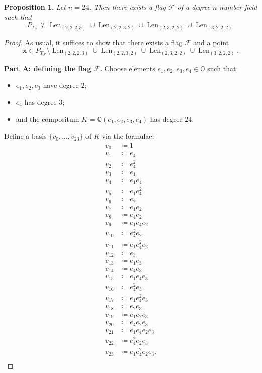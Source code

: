 \documentclass[letterpaper,10pt]{amsart}
\DeclareMathOperator{\Len}{Len}
\newcommand{\QQ}{\mathbb{Q}}      %
\newcommand{\cF}{\mathcal{F}}
\newtheorem{proposition}[theorem]{Proposition}
\theoremstyle{definition}
\theoremstyle{remark}
\begin{document}
\begin{proposition}
\label{lem:24}
Let $n = 24$. Then there exists a flag $\cF$ of a degree $n$ number field such that 
\[
	P_{T_{\cF}} \not \subseteq \Len_{(2,2,2,3)} \cup \Len_{(2,2,3,2)} \cup \Len_{(2,3,2,2)} \cup \Len_{(3,2,2,2)}
\]
\end{proposition}
\begin{proof}
As usual, it suffices to show that there exists a flag $\cF$ and a point
\[
	\mathbf{x} \in P_{T_{\cF}} \setminus  \Len_{(2,2,2,3)} \cup \Len_{(2,2,3,2)} \cup \Len_{(2,3,2,2)} \cup \Len_{(3,2,2,2)}.
\]

\noindent \textbf{Part A: defining the flag $\cF$.}
Choose elements $e_1,e_2,e_3,e_4 \in \overline{\QQ}$ such that:
\begin{itemize}
\item $e_1,e_2,e_3$ have degree $2$;
\item $e_4$ has degree $3$;
\item and the compositum $K= \QQ(e_1,e_2,e_3,e_4)$ has degree $24$.
\end{itemize}
Define a basis $\{v_0,\dots,v_{23}\}$ of $K$ via the formulae:
\begin{align*}
v_0 & \coloneqq 1 \\
v_1 & \coloneqq e_4 \\
v_2 & \coloneqq e^2_4 \\
v_3 & \coloneqq e_1 \\
v_4 & \coloneqq e_1e_4 \\
v_5 & \coloneqq e_1e_4^2 \\
v_6 & \coloneqq e_2 \\
v_7 & \coloneqq e_1e_2 \\
v_8 & \coloneqq e_4e_2 \\
v_9 & \coloneqq e_1e_4e_2 \\
v_{10} & \coloneqq e^2_4e_2 \\
v_{11} & \coloneqq e_1e^2_4e_2 \\
v_{12} & \coloneqq e_3 \\
v_{13} & \coloneqq e_1e_3 \\
v_{14} & \coloneqq e_4e_3 \\
v_{15} & \coloneqq e_1e_4e_3 \\
v_{16} & \coloneqq e^2_4e_3 \\
v_{17} & \coloneqq e_1e^2_4e_3 \\
v_{18} & \coloneqq e_2e_3 \\
v_{19} & \coloneqq e_1e_2e_3 \\
v_{20} & \coloneqq e_4e_2e_3 \\
v_{21} & \coloneqq e_1e_4e_2e_3 \\
v_{22} & \coloneqq e^2_4e_2e_3 \\
v_{23} & \coloneqq e_1e^2_4e_2e_3. \\
\end{align*}


\end{proof}
\end{document}
